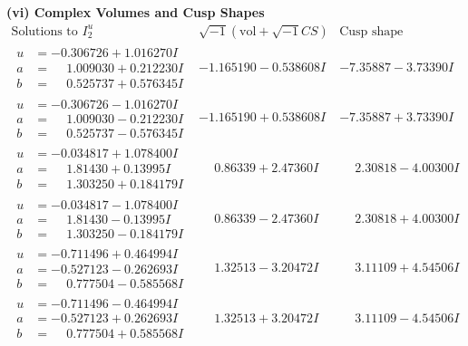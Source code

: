 \documentclass[1p]{elsarticle_modified}
\theoremstyle{definition}
\newcommand{\I}{\sqrt{-1}}
\begin{document}
\newpage\flushleft \textbf{(vi) Complex Volumes and Cusp Shapes}
$$\begin{array}{c|c|c}  
\text{Solutions to }I^u_{2}& \I (\text{vol} + \sqrt{-1}CS) & \text{Cusp shape}\\
 \hline 
\begin{aligned}
u &= -0.306726 + 1.016270 I \\
a &= \phantom{-}1.009030 + 0.212230 I \\
b &= \phantom{-}0.525737 + 0.576345 I\end{aligned}
 & -1.165190 - 0.538608 I & -7.35887 - 3.73390 I \\ \hline\begin{aligned}
u &= -0.306726 - 1.016270 I \\
a &= \phantom{-}1.009030 - 0.212230 I \\
b &= \phantom{-}0.525737 - 0.576345 I\end{aligned}
 & -1.165190 + 0.538608 I & -7.35887 + 3.73390 I \\ \hline\begin{aligned}
u &= -0.034817 + 1.078400 I \\
a &= \phantom{-}1.81430 + 0.13995 I \\
b &= \phantom{-}1.303250 + 0.184179 I\end{aligned}
 & \phantom{-}0.86339 + 2.47360 I & \phantom{-}2.30818 - 4.00300 I \\ \hline\begin{aligned}
u &= -0.034817 - 1.078400 I \\
a &= \phantom{-}1.81430 - 0.13995 I \\
b &= \phantom{-}1.303250 - 0.184179 I\end{aligned}
 & \phantom{-}0.86339 - 2.47360 I & \phantom{-}2.30818 + 4.00300 I \\ \hline\begin{aligned}
u &= -0.711496 + 0.464994 I \\
a &= -0.527123 - 0.262693 I \\
b &= \phantom{-}0.777504 - 0.585568 I\end{aligned}
 & \phantom{-}1.32513 - 3.20472 I & \phantom{-}3.11109 + 4.54506 I \\ \hline\begin{aligned}
u &= -0.711496 - 0.464994 I \\
a &= -0.527123 + 0.262693 I \\
b &= \phantom{-}0.777504 + 0.585568 I\end{aligned}
 & \phantom{-}1.32513 + 3.20472 I & \phantom{-}3.11109 - 4.54506 I \\ \hline\begin{aligned}

\end{aligned}
\end{array}$$
\end{document}
